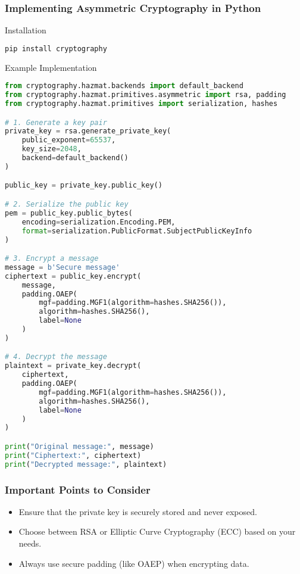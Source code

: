 \documentclass{beamer}
\begin{document}
\begin{frame}[fragile]
    \frametitle{Implementing Asymmetric Cryptography in Python}
    \begin{block}{Installation}
        \begin{lstlisting}[language=bash]
pip install cryptography
        \end{lstlisting}
    \end{block}

    \begin{block}{Example Implementation}
        \begin{lstlisting}[language=Python]
from cryptography.hazmat.backends import default_backend
from cryptography.hazmat.primitives.asymmetric import rsa, padding
from cryptography.hazmat.primitives import serialization, hashes

# 1. Generate a key pair
private_key = rsa.generate_private_key(
    public_exponent=65537,
    key_size=2048,
    backend=default_backend()
)

public_key = private_key.public_key()

# 2. Serialize the public key
pem = public_key.public_bytes(
    encoding=serialization.Encoding.PEM,
    format=serialization.PublicFormat.SubjectPublicKeyInfo
)

# 3. Encrypt a message
message = b'Secure message'
ciphertext = public_key.encrypt(
    message,
    padding.OAEP(
        mgf=padding.MGF1(algorithm=hashes.SHA256()),
        algorithm=hashes.SHA256(),
        label=None
    )
)

# 4. Decrypt the message
plaintext = private_key.decrypt(
    ciphertext,
    padding.OAEP(
        mgf=padding.MGF1(algorithm=hashes.SHA256()),
        algorithm=hashes.SHA256(),
        label=None
    )
)

print("Original message:", message)
print("Ciphertext:", ciphertext)
print("Decrypted message:", plaintext)
        \end{lstlisting}
    \end{block}
\end{frame}

\begin{frame}
    \frametitle{Important Points to Consider}
    \begin{itemize}
        \item Ensure that the private key is securely stored and never exposed.
        \item Choose between RSA or Elliptic Curve Cryptography (ECC) based on your needs.
        \item Always use secure padding (like OAEP) when encrypting data.
    \end{itemize}
\end{frame}
\end{document}
